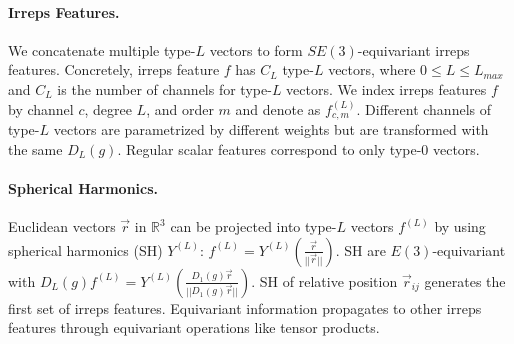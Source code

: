 \vspace{-3mm}
\paragraph{Irreps Features.}
We concatenate multiple type-$L$ vectors to form $SE(3)$-equivariant irreps features. 
Concretely, irreps feature $f$ has $C_{L}$ type-$L$ vectors, where $0 \leq L \leq L_{max}$ and $C_{L}$ is the number of channels for type-$L$ vectors.
We index irreps features $f$ by channel $c$, degree $L$, and order $m$ and denote as $f^{(L)}_{c, m}$.
Different channels of type-$L$ vectors are parametrized by different weights but are transformed with the same $D_{L}(g)$.
Regular scalar features correspond to only type-$0$ vectors.

\vspace{-3mm}
\paragraph{Spherical Harmonics.}
Euclidean vectors $\vec{r}$ in $\mathbb{R}^3$ can be projected into type-$L$ vectors $f^{(L)}$ by using spherical harmonics (SH) $Y^{(L)}$: $f^{(L)} = Y^{(L)}(\frac{\vec{r}}{|| \vec{r} ||})$.
SH are $E(3)$-equivariant with $D_L(g) f^{(L)} = Y^{(L)}(\frac{D_{1}(g) \vec{r}}{|| D_{1}(g) \vec{r} ||})$.
SH of relative position $\vec{r}_{ij}$ generates the first set of irreps features. Equivariant information propagates to other irreps features through equivariant operations like tensor products.


